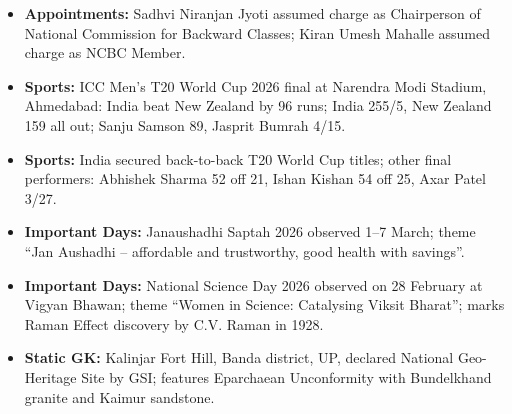 \documentclass[10pt,a4paper]{article}
\begin{document}
\begin{itemize}
    \item \textbf{Appointments:} Sadhvi Niranjan Jyoti assumed charge as Chairperson of National Commission for Backward Classes; Kiran Umesh Mahalle assumed charge as NCBC Member.
    \item \textbf{Sports:} ICC Men's T20 World Cup 2026 final at Narendra Modi Stadium, Ahmedabad: India beat New Zealand by 96 runs; India 255/5, New Zealand 159 all out; Sanju Samson 89, Jasprit Bumrah 4/15.
    \item \textbf{Sports:} India secured back-to-back T20 World Cup titles; other final performers: Abhishek Sharma 52 off 21, Ishan Kishan 54 off 25, Axar Patel 3/27.
    \item \textbf{Important Days:} Janaushadhi Saptah 2026 observed 1--7 March; theme ``Jan Aushadhi -- affordable and trustworthy, good health with savings''.
    \item \textbf{Important Days:} National Science Day 2026 observed on 28 February at Vigyan Bhawan; theme ``Women in Science: Catalysing Viksit Bharat''; marks Raman Effect discovery by C.V. Raman in 1928.
    \item \textbf{Static GK:} Kalinjar Fort Hill, Banda district, UP, declared National Geo-Heritage Site by GSI; features Eparchaean Unconformity with Bundelkhand granite and Kaimur sandstone.
\end{itemize}
\end{document}
